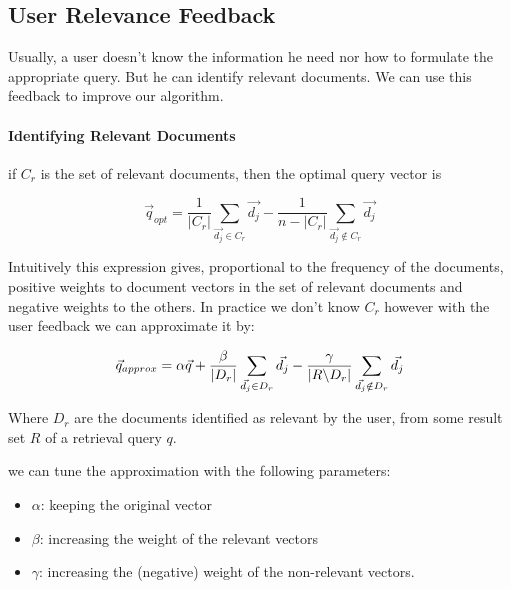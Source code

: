 \subsection{User Relevance Feedback}

Usually, a user doesn't know the information he need nor how to formulate the appropriate query. But he can identify relevant documents. We can use this feedback to improve our algorithm.
\paragraph{Identifying Relevant Documents}
if $C_r$ is the set of relevant documents, then the optimal query vector is 

\[ \vec{q}_{opt} = \frac{1}{|C_r|} \sum_{\vec{d_j} \in C_r} \vec{d_j} - \frac{1}{n-|C_r|} \sum_{\vec{d_j} \not \in C_r} \vec{d_j} \]

Intuitively this expression gives, proportional to the frequency of the documents, positive weights to document vectors in the set of relevant documents and negative weights to the others. In practice we don't know $C_r$ however with the user feedback we can approximate it by:

\[ \vec{q}_{approx} = \alpha\vec{q} + \frac{\beta}{|D_r|}\sum_{\vec{d_j} \in D_r} \vec{d_j} - \frac{\gamma}{\abs{R\symbol{92}D_r}} \sum_{\vec{d_j} \notin D_r} \vec{d_j} \]

Where $D_r$ are the documents identified as relevant by the user, from some result set $R$ of a retrieval query $q$.

we can tune the approximation with the following parameters:
\begin{itemize}
\item $\alpha$: keeping the original vector
\item $\beta$: increasing the weight of the relevant vectors
\item $\gamma$: increasing the (negative) weight of the non-relevant vectors.
\end{itemize}

\afterpage{\null\newpage}

